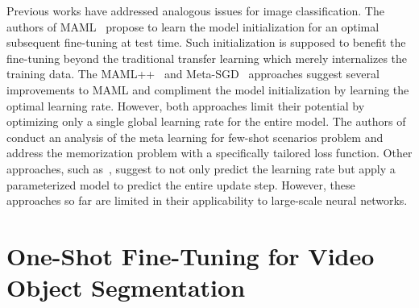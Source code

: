 \documentclass{article}
\begin{document}
Previous works have addressed analogous issues for image classification. The authors of MAML~\cite{MAML} propose to learn the model initialization for an optimal subsequent fine-tuning at test time.
Such initialization is supposed to benefit the fine-tuning beyond the traditional transfer learning which merely internalizes the training data.
The MAML++~\cite{how_train_maml} and Meta-SGD~\cite{Meta-SGD} approaches suggest several improvements to MAML and compliment the model initialization by learning the optimal learning rate.
However, both approaches limit their potential by optimizing only a single global learning rate for the entire model.
The authors of~\cite{memorization} conduct an analysis of the meta learning for few-shot scenarios problem and address the memorization problem with a specifically tailored loss function.
Other approaches, such as~\cite{Ravi2017OptimizationAA}, suggest to not only predict the learning rate but apply a parameterized model to predict the entire update step.
However, these approaches so far are limited in their applicability to large-scale neural networks.
 

\section{One-Shot Fine-Tuning for Video Object Segmentation} \label{sec:osvos}
\end{document}
